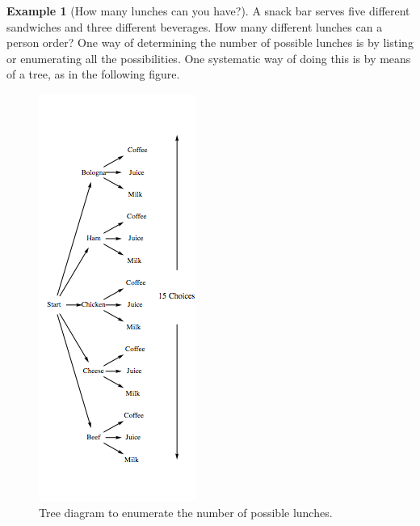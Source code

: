 \documentclass[10pt,]{book}
\theoremstyle{plain}
\theoremstyle{definition}
\theoremstyle{definition}
\newtheorem{example}[theorem]{Example}
\theoremstyle{definition}
\begin{document}
\begin{example}[How many lunches can you have?]\label{lunch-possibilies1}
A snack bar serves five different sandwiches and three different beverages. How many different lunches can a person order? One way of determining the number of possible lunches is by listing or enumerating all the possibilities. One systematic way of doing this is by means of a tree, as in the following figure.%
\leavevmode%
\begin{figure}
\centering
\includegraphics[width=1\linewidth]{images/lunch.png}
\caption{Tree diagram to enumerate the number of possible lunches.
                \label{lunch}}
\end{figure}
\par


\end{example}
\end{document}
